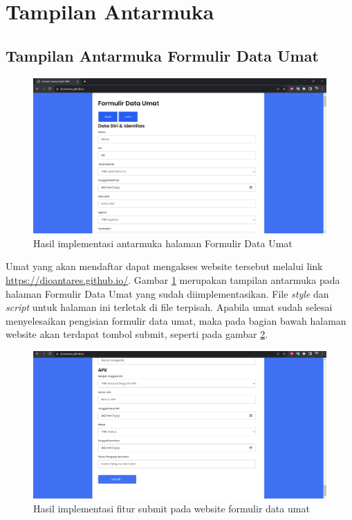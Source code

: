 \section{Tampilan Antarmuka}
\label{sec:tampilanAntarMuka}

\subsection{Tampilan Antarmuka Formulir Data Umat}
\label{sec:tampilanAntarmukaFormulir}

\begin{figure}[H]
	\centering
	\includegraphics[scale=0.4]{Gambar/halamanFormulir.png}
	\caption{Hasil implementasi antarmuka halaman Formulir Data Umat} 
	\label{fig:formDataUmatFull}
\end{figure}

Umat yang akan mendaftar dapat mengakses website tersebut melalui link \url{https://dioantares.github.io/}. Gambar \ref{fig:formDataUmatFull} merupakan tampilan antarmuka pada halaman Formulir Data Umat yang sudah diimplementasikan. File \textit{style} dan \textit{script} untuk halaman ini terletak di file terpisah.  Apabila umat sudah selesai menyelesaikan pengisian formulir data umat, maka pada bagian bawah halaman website akan terdapat tombol submit, seperti pada gambar \ref{fig:fiturSubmit}.

\begin{figure}[H]
	\centering
	\includegraphics[scale=0.4]{Gambar/fiturSubmit.png}
	\caption{Hasil implementasi fitur submit pada website formulir data umat} 
	\label{fig:fiturSubmit}
\end{figure}

